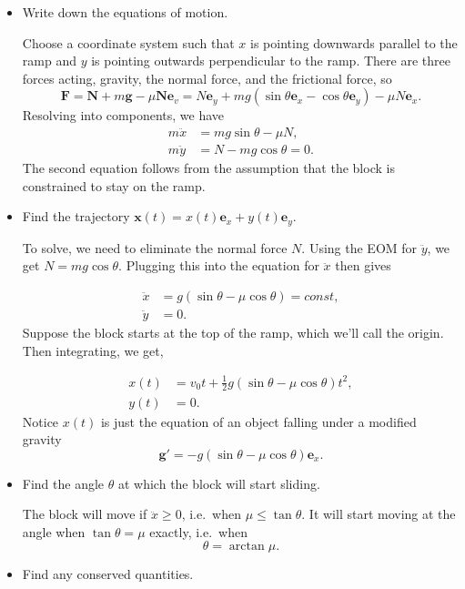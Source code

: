 \documentclass[
  letterpaper,
  DIV=11,
  numbers=noendperiod]{scrreprt}
\begin{document}
\begin{itemize}
\item
  Write down the equations of motion.

  Choose a coordinate system such that \(x\) is pointing downwards
  parallel to the ramp and \(y\) is pointing outwards perpendicular to
  the ramp. There are three forces acting, gravity, the normal force,
  and the frictional force, so \[
  \mathbf{F} = \mathbf{N} + m\mathbf{g} - \mu \mathbf{N} \mathbf{e}_v = N\mathbf{e}_y + mg(\sin\theta\mathbf{e}_x - \cos\theta\mathbf{e}_y) - \mu N \mathbf{e}_x.
  \] Resolving into components, we have \[
  \begin{align*} 
  m \ddot x &= mg\sin\theta - \mu N, \\
  m \ddot y &= N - mg\cos\theta = 0.
  \end{align*}
  \] The second equation follows from the assumption that the block is
  constrained to stay on the ramp.
\item
  Find the trajectory
  \(\mathbf{x}(t) = x(t)\mathbf{e}_x + y(t)\mathbf{e}_y\).

  To solve, we need to eliminate the normal force \(N\). Using the EOM
  for \(\ddot y\), we get \(N = mg\cos\theta\). Plugging this into the
  equation for \(\ddot x\) then gives

  \[
  \begin{align*} 
  \ddot x &= g(\sin\theta - \mu\cos\theta) = const, \\
  \ddot y &= 0.
  \end{align*}
  \] Suppose the block starts at the top of the ramp, which we'll call
  the origin. Then integrating, we get,

  \[
  \begin{align*} 
  x(t) &= v_0 t + \frac{1}{2}g(\sin\theta - \mu\cos\theta)t^2, \\
  y(t) &= 0.
  \end{align*}
  \] Notice \(x(t)\) is just the equation of an object falling under a
  modified gravity \[
  \mathbf{g}'=-g(\sin\theta - \mu\cos\theta)\mathbf{e}_x.
  \]
\item
  Find the angle \(\theta\) at which the block will start sliding.

  The block will move if \(\ddot x \geq 0\), i.e.~when
  \(\mu \leq \tan\theta\). It will start moving at the angle when
  \(\tan\theta=\mu\) exactly, i.e.~when \[
  \theta = \arctan\mu.
  \]
\item
  Find any conserved quantities.


\end{itemize}
\end{document}
